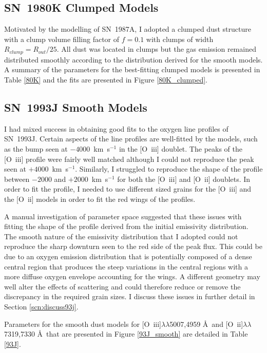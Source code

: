 \subsection{SN~1980K Clumped Models}

Motivated by the modelling of SN~1987A, I adopted a clumped dust structure with a clump volume filling factor of $f=0.1$ with clumps of width $R_{clump}=R_{out}/25$.  All dust was located in clumps but the gas emission remained distributed smoothly according to the distribution derived for the smooth models.  A summary of the parameters for the best-fitting clumped models is presented in Table \ref{80K} and the fits are presented in Figure \ref{80K_clumped}.





\subsection{SN~1993J Smooth Models}
I had mixed success in obtaining good fits to the oxygen line profiles of SN~1993J.  Certain aspects of the line profiles are well-fitted by the models, such as the bump seen at $-4000$~km~s$^{-1}$ in the [O~{\sc iii}] doublet.  The peaks of the [O~{\sc iii}] profile were fairly well matched although I could not reproduce the peak seen at $+4000$~km~s$^{-1}$.  Similarly, I struggled to reproduce the shape of the profile between $-2000$ and $+2000$~km~s$^{-1}$ for both the [O~{\sc iii}] and [O~{\sc ii}] doublets.  In order to fit the profile, I needed to use different sized grains for the [O~{\sc iii}] and the [O~{\sc ii}] models in order to fit the red wings of the profiles.


A manual investigation of parameter space suggested that these issues with fitting the shape of the profile derived from the initial emissivity distribution.  The smooth nature of the emissivity distribution that I adopted could not reproduce the sharp downturn seen to the red side of the peak flux.  This could be due to an oxygen emission distribution that is potentially composed of a dense central region that produces the steep variations in the central regions with a more diffuse oxygen envelope accounting for the wings.  A different geometry may well alter the effects of scattering and could therefore reduce or remove the discrepancy in the required grain sizes.  I discuss these issues in further detail in Section \ref{scn:discuss93j}.

Parameters for the smooth dust models for [O~{\sc iii}]$\lambda\lambda$5007,4959 \AA\ and [O~{\sc ii}]$\lambda\lambda$7319,7330 \AA\   that are presented in Figure \ref{93J_smooth} are detailed in Table \ref{93J}. 
 
